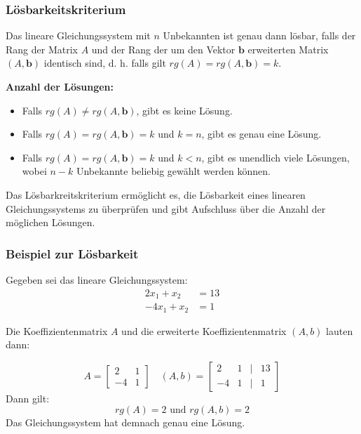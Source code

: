 \documentclass{beamer}
\begin{document}
\begin{frame}
  \frametitle{Lösbarkeitskriterium}
  
  Das lineare Gleichungssystem mit $n$ Unbekannten ist genau dann lösbar, falls der Rang der Matrix $A$ und der Rang der um den Vektor $\mathbf{b}$ erweiterten Matrix $(A, \mathbf{b})$ identisch sind, d. h. falls gilt $rg(A) = rg(A, \mathbf{b}) = k$.
  
  \vspace{0.3cm}
  
  \textbf{Anzahl der Lösungen:}
  
  \begin{itemize}
    \item Falls $rg(A) \neq rg(A, \mathbf{b})$, gibt es keine Lösung.
    \item Falls $rg(A) = rg(A, \mathbf{b}) = k$ und $k = n$, gibt es genau eine Lösung.
    \item Falls $rg(A) = rg(A, \mathbf{b}) = k$ und $k < n$, gibt es unendlich viele Lösungen, wobei $n - k$ Unbekannte beliebig gewählt werden können.
  \end{itemize}
  
  \vspace{0.3cm}
  
  Das Lösbarkreitskriterium ermöglicht es, die Lösbarkeit eines linearen Gleichungssystems zu überprüfen und gibt Aufschluss über die Anzahl der möglichen Lösungen.
\end{frame}

\begin{frame}
  \frametitle{Beispiel zur Lösbarkeit}
  Gegeben sei das lineare Gleichungssystem:
  \[
    \begin{aligned}
      2x_1 + x_2 &= 13 \\
      -4x_1 + x_2 &= 1
    \end{aligned}
  \]

  Die Koeffizientenmatrix $A$ und die erweiterte Koeffizientenmatrix $(A, b)$ lauten dann:

  \[
    A=\begin{bmatrix}
      2 & 1  \\
      -4 & 1
    \end{bmatrix}
    \quad
    (A,b)=\begin{bmatrix}
      2 & 1 & | & 13 \\
      -4 & 1 & | & 1
    \end{bmatrix}
  \]
  Dann gilt:
  \[rg(A) = 2 \text{ und } rg(A,b) = 2\]
  Das Gleichungssystem hat demnach genau eine Lösung.

\end{frame}
\end{document}
